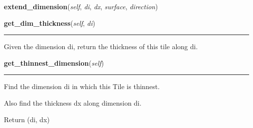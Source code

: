 \hspace{.8\funcindent}\begin{boxedminipage}{\funcwidth}

    \raggedright \textbf{extend\_dimension}(\textit{self}, \textit{di}, \textit{dx}, \textit{surface}, \textit{direction})

\setlength{\parskip}{2ex}
\setlength{\parskip}{1ex}
    \end{boxedminipage}

    \label{Tiling:Tile:get_dim_thickness}

    \vspace{0.5ex}

\hspace{.8\funcindent}\begin{boxedminipage}{\funcwidth}

    \raggedright \textbf{get\_dim\_thickness}(\textit{self}, \textit{di})

    \vspace{-1.5ex}

    \rule{\textwidth}{0.5\fboxrule}
\setlength{\parskip}{2ex}
    Given the dimension di, return the thickness of this tile along di.

\setlength{\parskip}{1ex}
    \end{boxedminipage}

    \label{Tiling:Tile:get_thinnest_dimension}

    \vspace{0.5ex}

\hspace{.8\funcindent}\begin{boxedminipage}{\funcwidth}

    \raggedright \textbf{get\_thinnest\_dimension}(\textit{self})

    \vspace{-1.5ex}

    \rule{\textwidth}{0.5\fboxrule}
\setlength{\parskip}{2ex}
    Find the dimension di in which this Tile is thinnest.

    Also find the thickness dx along dimension di.

    Return (di, dx)

\setlength{\parskip}{1ex}
    \end{boxedminipage}

